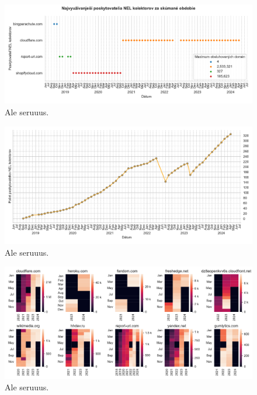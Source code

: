 \pagebreak


\begin{figure}[!htb]
\begin{center}
 \includegraphics[scale=0.55]{obrazky-figures/httparchive_nel_collector_provider_top_1_over_time.pdf}
 \caption{\centering Ale seruuus.}
 \label{fig:httparchive-nel-collector-provider-top-1-over-time}
\end{center}
\end{figure}

\pagebreak


\begin{figure}[!htb]
\begin{center}
 \includegraphics[scale=0.57]{obrazky-figures/httparchive_nel_collector_provider_count.pdf}
 \caption{\centering Ale seruuus.}
 \label{fig:httparchive-nel-collector-provider-top-1-over-time}
\end{center}
\end{figure}

\pagebreak


\begin{figure}[!htb]
\begin{center}
 \includegraphics[scale=0.54]{obrazky-figures/httparchive_nel_latest_collector_provider_stats.pdf}
 \caption{\centering Ale seruuus.}
 \label{fig:httparchive-nel-latest-collector-provider-stats}
\end{center}
\end{figure}


